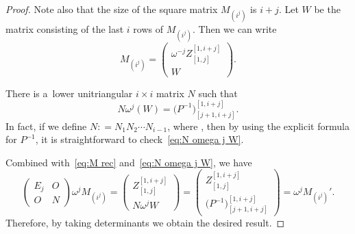 \documentclass[10pt,a4paper]{amsart}
\numberwithin{equation}{section}
\theoremstyle{definition}
\begin{document}
\begin{proof}
Note also that the size of the square matrix $M_{(i^j)}$ is $i+j$.
Let $W$ be the matrix consisting of the last $i$ rows of $M_{(i^j)}$.
Then we can write \begin{equation}
M_{(i^j)}=\left(
\begin{matrix}
\omega^{-j}Z_{[1,j]}^{[1,i+j]}\\\hline
W
\end{matrix}
\right).\label{eq:M rec}
\end{equation}


There is a~lower unitriangular $i\times i$ matrix $N$
such that
\begin{equation}
N \omega^j(W)
=\bigl(P^{-1}\bigr)_{[j+1,i+j]}^{[1,i+j]}.
\label{eq:N omega j W}
\end{equation}
In fact, if we define
$
N:
=
N_1
N_2
\cdots
N_{i-1}$,
where
, then by using the explicit formula for $P^{-1}$, it is straightforward to check~\eqref{eq:N omega j W}.




Combined with~\eqref{eq:M rec} and~\eqref{eq:N omega j W}, we have
\[
\begin{pmatrix}
E_j & O\\
O & N
\end{pmatrix}\omega^j M_{(i^j)}=\left(
\begin{matrix}
Z_{[1,j]}^{[1,i+j]}\\\hline
N\omega^j W
\end{matrix}
\right)=\left(
\begin{matrix}
Z_{[1,j]}^{[1,i+j]}\\\hline
\bigl(P^{-1}\bigr)_{[j+1,i+j]}^{[1,i+j]}
\end{matrix}
\right)=\omega^j M_{(i^j)}'.
\]
Therefore, by taking determinants we
obtain the desired result.
\end{proof}
\end{document}
